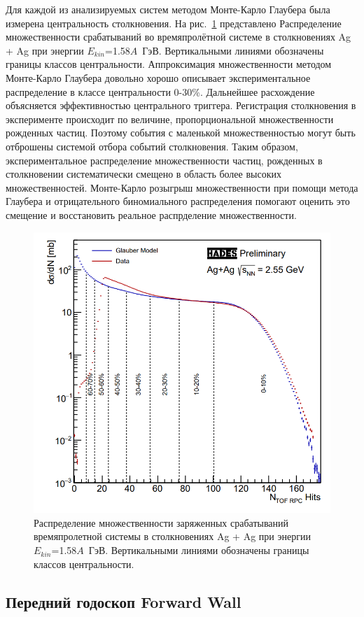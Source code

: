 Для каждой из анализируемых систем методом Монте-Карло Глаубера была измерена центральность столкновения. 
На рис.~\ref{fig:hades_centrality} представлено Распределение множественности срабатываний во времяпролётной системе в столкновениях Ag + Ag при энергии $E_{kin}$=1.58$A$~ГэВ. Вертикальными линиями обозначены границы классов центральности.
Аппроксимация множественности методом Монте-Карло Глаубера довольно хорошо описывает экспериментальное распределение в классе центральности 0-30\%.
Дальнейшее расхождение объясняется эффективностью центрального триггера.
Регистрация столкновения в эксперименте происходит по величине, пропорциональной множественности рожденных частиц.
Поэтому события с маленькой множественностью могут быть отброшены системой отбора событий столкновения.
Таким образом, экспериментальное распределение множественности частиц, рожденных в столкновении систематически смещено в область более высоких множественностей.
Монте-Карло розыгрыш множественности при помощи метода Глаубера и отрицательного биномиального распределения помогают оценить это смещение и восстановить реальное распрделение множественности.  
%
\begin{figure}[ht]
\begin{center}
\includegraphics[width=0.75\linewidth]{images/hades_mult.png}
\caption{Распределение множественности заряженных срабатываний времяпролетной системы в столкновениях Ag + Ag при энергии $E_{kin}$=1.58$A$~ГэВ. Вертикальными линиями обозначены границы классов центральности.}
\label{fig:hades_centrality}
\end{center}
\end{figure}

\subsection{Передний годоскоп Forward Wall}


